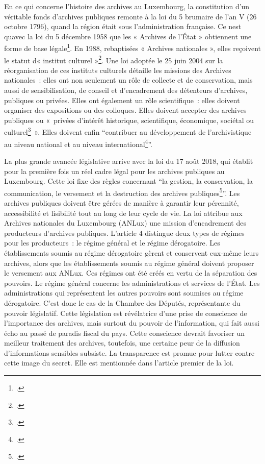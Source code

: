 En ce qui concerne l'histoire des archives au Luxembourg, la
constitution d'un véritable fonds d'archives publiques
remonte à la loi du 5 brumaire de l'an V (26 octobre 1796), quand la
région était sous l'administration française. Ce
n\textquotesingle est qu\textquotesingle avec la loi du 5 décembre 1958
que les « Archives de l'État » obtiennent une forme de base
légale\footcite{loi_1958}. En 1988, rebaptisées « Archives
nationales », elles reçoivent le statut d\textquotesingle« institut
culturel »\footcite{loi_1988}. Une loi adoptée le 25 juin 2004 sur
la réorganisation de ces instituts culturels détaille les missions des
Archives nationales~: elles ont non seulement un rôle de collecte et de
conservation, mais aussi de sensibilisation, de conseil et d'encadrement
des détenteurs d'archives, publiques ou privées. Elles ont également un
rôle scientifique~: elles doivent organiser des expositions ou des
colloques. Elles doivent accepter des archives publiques ou «~privées
d'intérêt historique, scientifique, économique, sociétal ou
culturel\footcite{loi_2004}~». Elles doivent enfin
\enquote{contribuer au développement de l'archivistique au niveau national et
au niveau international\footcite{loi_2004}}.

 La plus grande
avancée législative arrive avec la loi du 17 août 2018, qui établit pour
la première fois un réel cadre légal pour les archives publiques au
Luxembourg. Cette loi fixe des règles concernant \enquote{la gestion, la
conservation, la communication, le versement et la destruction des
archives publiques\footcite{loi_2018}}. Les
archives publiques doivent être gérées de manière à garantir leur
pérennité, accessibilité et
lisibilité tout au long de leur cycle de vie. La loi attribue aux
Archives nationales du Luxembourg (ANLux) une mission d'encadrement des
producteurs d'archives publiques. L'article 4
distingue deux types de régimes pour les producteurs~: le régime général
et le régime dérogatoire.
Les établissements soumis au régime dérogatoire gèrent et
conservent eux-même leurs archives, alors que les établissements soumis
au régime général doivent proposer le versement aux ANLux. Ces régimes
ont été créés en vertu de la séparation des pouvoirs. Le régime général
concerne les administrations et services de l'État. Les administrations
qui représentent les autres pouvoirs sont soumises au régime
dérogatoire. C'est donc le cas de la Chambre des Députés, représentante
du pouvoir législatif. Cette législation est révélatrice d'une prise de
conscience de l'importance des archives, mais surtout du pouvoir de
l'information, qui fait aussi écho au passé de paradis fiscal du pays.
Cette conscience devrait favoriser un meilleur traitement des archives,
toutefois, une certaine peur de la diffusion d'informations sensibles
subsiste. La transparence est promue pour lutter contre cette
image du secret. Elle est mentionnée dans l'article premier de la loi.
\newline

